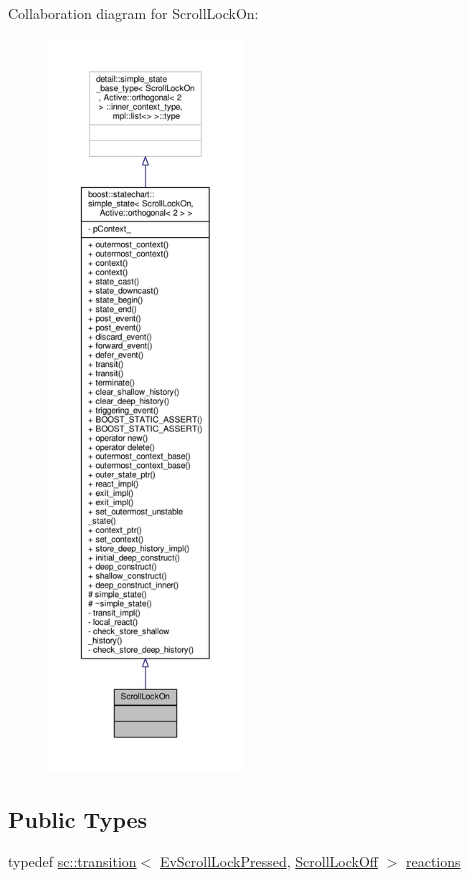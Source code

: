 Collaboration diagram for Scroll\+Lock\+On\+:
\nopagebreak
\begin{figure}[H]
\begin{center}
\leavevmode
\includegraphics[height=550pt]{struct_scroll_lock_on__coll__graph}
\end{center}
\end{figure}
\subsection*{Public Types}
\begin{DoxyCompactItemize}
\item 
typedef \mbox{\hyperlink{classboost_1_1statechart_1_1transition}{sc\+::transition}}$<$ \mbox{\hyperlink{struct_ev_scroll_lock_pressed}{Ev\+Scroll\+Lock\+Pressed}}, \mbox{\hyperlink{struct_scroll_lock_off}{Scroll\+Lock\+Off}} $>$ \mbox{\hyperlink{struct_scroll_lock_on_a20a7579e66e108f81666db1566e38faa}{reactions}}
\end{DoxyCompactItemize}
